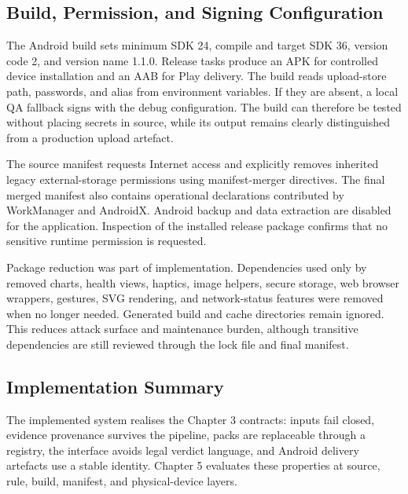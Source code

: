\subsection{Build, Permission, and Signing Configuration}

The Android build sets minimum SDK 24, compile and target SDK 36, version code 2, and version name 1.1.0. Release tasks produce an APK for controlled device installation and an AAB for Play delivery. The build reads upload-store path, passwords, and alias from environment variables. If they are absent, a local QA fallback signs with the debug configuration. The build can therefore be tested without placing secrets in source, while its output remains clearly distinguished from a production upload artefact.

The source manifest requests Internet access and explicitly removes inherited legacy external-storage permissions using manifest-merger directives. The final merged manifest also contains operational declarations contributed by WorkManager and AndroidX. Android backup and data extraction are disabled for the application. Inspection of the installed release package confirms that no sensitive runtime permission is requested.

Package reduction was part of implementation. Dependencies used only by removed charts, health views, haptics, image helpers, secure storage, web browser wrappers, gestures, SVG rendering, and network-status features were removed when no longer needed. Generated build and cache directories remain ignored. This reduces attack surface and maintenance burden, although transitive dependencies are still reviewed through the lock file and final manifest.

\subsection{Implementation Summary}

The implemented system realises the Chapter 3 contracts: inputs fail closed, evidence provenance survives the pipeline, packs are replaceable through a registry, the interface avoids legal verdict language, and Android delivery artefacts use a stable identity. Chapter 5 evaluates these properties at source, rule, build, manifest, and physical-device layers.
